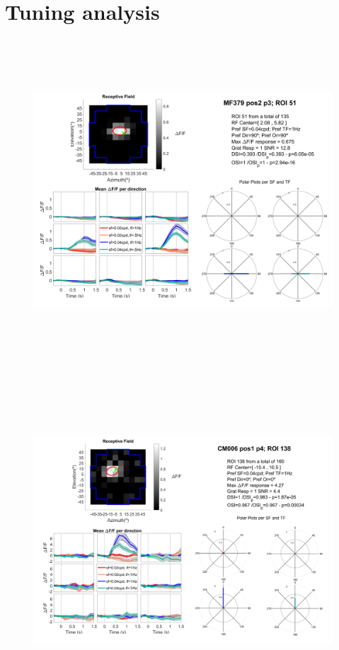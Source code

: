 \section{Tuning analysis}


\begin{figure}[H] \centering \includegraphics[width=12cm,height=12cm,keepaspectratio]{Figures/7.Results/tuning/MF379_pos2_p3_ROI0051.png} 
\end{figure}

\begin{figure}[H] \centering \includegraphics[width=12.5cm,height=12.5cm,keepaspectratio]{Figures/7.Results/tuning/CM006_pos1_p4_ROI0138.png} 
\end{figure}

